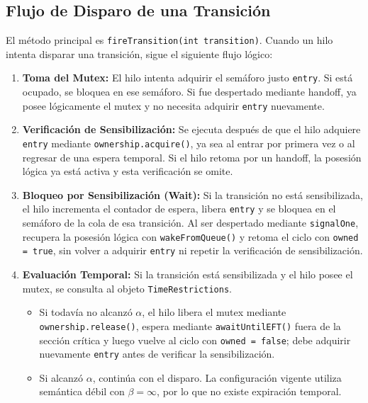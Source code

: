 \documentclass[11pt,a4paper]{article}
\begin{document}
\subsection{Flujo de Disparo de una Transición}                                                                                                                           

El método principal es \texttt{fireTransition(int transition)}. Cuando un hilo intenta disparar una transición, sigue el siguiente flujo lógico:
     \begin{enumerate}                                                                                                                                                                                                                              
          \item \textbf{Toma del Mutex:} El hilo intenta adquirir el semáforo justo \texttt{entry}. Si está ocupado, se bloquea en ese semáforo. Si fue despertado mediante handoff, ya posee lógicamente el mutex y no necesita adquirir \texttt{entry} nuevamente.
          \item \textbf{Verificación de Sensibilización:} Se ejecuta después de que el hilo adquiere \texttt{entry} mediante \texttt{ownership.acquire()}, ya sea al entrar por primera vez o al regresar de una espera temporal. Si el hilo retoma por un handoff, la posesión lógica ya está activa y esta verificación se omite.
           \item \textbf{Bloqueo por Sensibilización (Wait):} Si la transición no está sensibilizada, el hilo incrementa el contador de espera, libera \texttt{entry} y se bloquea en el semáforo de la cola de esa transición. Al ser despertado mediante \texttt{signalOne}, recupera la posesión lógica con \texttt{wakeFromQueue()} y retoma el ciclo con \texttt{owned = true}, sin volver a adquirir \texttt{entry} ni repetir la verificación de sensibilización.
          \item \textbf{Evaluación Temporal:} Si la transición está sensibilizada y el hilo posee el mutex, se consulta al objeto \texttt{TimeRestrictions}.
           \begin{itemize}
               \item Si todavía no alcanzó $\alpha$, el hilo libera el mutex mediante \texttt{ownership.release()}, espera mediante \texttt{awaitUntilEFT()} fuera de la sección crítica y luego vuelve al ciclo con \texttt{owned = false}; debe adquirir nuevamente \texttt{entry} antes de verificar la sensibilización.
              \item Si alcanzó $\alpha$, continúa con el disparo. La configuración vigente utiliza semántica débil con $\beta=\infty$, por lo que no existe expiración temporal.

\end{itemize}
\end{enumerate}
\end{document}
